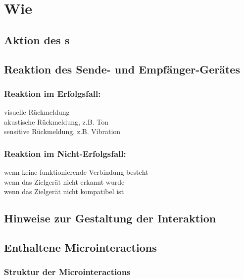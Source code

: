 
\section*{Wie}

\subsection*{Aktion des \rec s}
\useraction

\subsection*{Reaktion des Sende- und Empfänger-Gerätes}
\reaction

\subsubsection*{Reaktion im Erfolgsfall:}
\checkbox{\reactionSuccessVisual} visuelle Rückmeldung \\
\checkbox{\reactionSuccessAcustic} akustische Rückmeldung, z.B. Ton \\
\checkbox{\reactionSuccessSensitive} sensitive Rückmeldung, z.B. Vibration

\subsubsection*{Reaktion im Nicht-Erfolgsfall:}
\checkbox{\reactionFailureConnection} wenn keine funktionierende Verbindung besteht \reactionFailureConnectionDesc \\
\checkbox{\reactionFailureNoDevice} wenn das Zielgerät nicht erkannt wurde \reactionFailureNoDeviceDesc \\
\checkbox{\reactionFailureCompatibility} wenn das Zielgerät nicht kompatibel ist \reactionFailureCompatibilityDesc

\subsection*{Hinweise zur Gestaltung der Interaktion}
\designnotes

\subsection*{Enthaltene Microinteractions}
\microinteractions

\subsubsection*{Struktur der Microinteractions}
\microinteractionstabular

